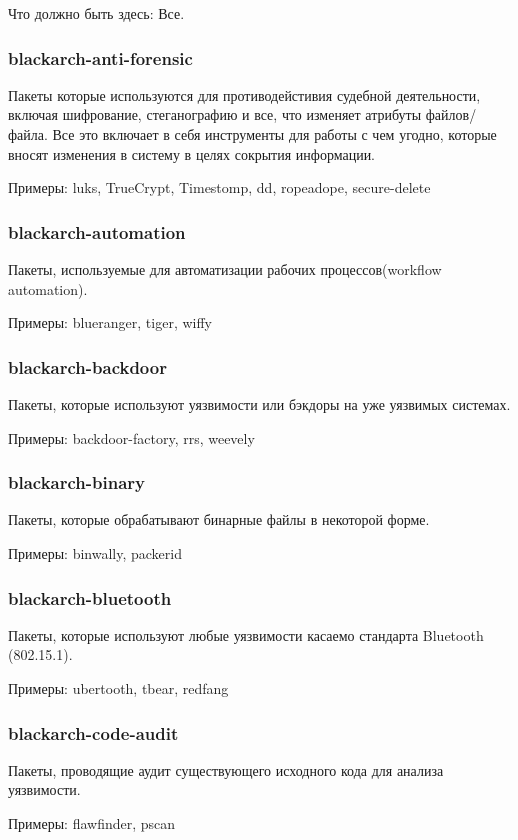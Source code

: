 \documentclass[a4paper, oneside, 11pt]{book}
\begin{document}
Что должно быть здесь: Все.

\subsubsection{blackarch-anti-forensic}
Пакеты которые используются для противодейстивия судебной деятельности,
включая шифрование, стеганографию и все, что изменяет атрибуты файлов/файла.
Все это включает в себя инструменты для работы с чем угодно, которые вносят
изменения в систему в целях сокрытия информации.

Примеры: luks, TrueCrypt, Timestomp, dd, ropeadope, secure-delete

\subsubsection{blackarch-automation}
Пакеты, используемые для автоматизации рабочих процессов(workflow automation).

Примеры: blueranger, tiger, wiffy

\subsubsection{blackarch-backdoor}
Пакеты, которые используют уязвимости или бэкдоры на уже уязвимых системах.

Примеры: backdoor-factory, rrs, weevely

\subsubsection{blackarch-binary}
Пакеты, которые обрабатывают бинарные файлы в некоторой форме.

Примеры: binwally, packerid

\subsubsection{blackarch-bluetooth}
Пакеты, которые используют любые уязвимости касаемо стандарта Bluetooth (802.15.1).

Примеры: ubertooth, tbear, redfang

\subsubsection{blackarch-code-audit}
Пакеты, проводящие аудит существующего исходного кода для анализа уязвимости.

Примеры: flawfinder, pscan
\end{document}
